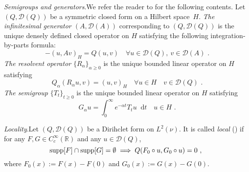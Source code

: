 \documentclass[11pt,letterpaper]{amsart}
\newcommand{\dom}[1]{\mathcal D(#1)}
\newcommand{\sem}[1]{\{#1\}_{t \ge 0}}
\newcommand{\domloc}[1]{\mathcal D_{\loc}(#1)}
\newcommand{\diff}{\mathop{}\!\mathrm{d}}
\newcommand{\R}{{\mathbb R}}
\newcommand{\comma}{\,\,\mathrm{,}\;\,}
\newcommand{\fstop}{\,\,\mathrm{.}}
\newcommand{\purple}[1]{{\color{purple}#1}}
\renewcommand{\1}{\mathbf 1}
\numberwithin{equation}{section}
\theoremstyle{plain}
\theoremstyle{definition}
\theoremstyle{remark}
\renewcommand{\paragraph}[1]{\medskip\emph{#1}.\quad}
\begin{document}
\paragraph{Semigroups and generators}We refer the reader to \cite[Chap.~I, Sec.~2]{MaRoe90} for the following contents. Let $(Q, \dom{Q})$ be a symmetric closed form on a Hilbert space~$H$.  {\it The infinitesimal generator $(A, \dom{A})$} corresponding to $(Q, \dom{Q})$ is the unique densely defined closed operator on $H$ satisfying the following integration-by-parts formula:
$$-(u, Av)_{H}=Q(u, v) \quad \forall u \in \dom{Q},\ v\in \dom{A} \fstop$$
{\it The resolvent operator} $\{R_\alpha\}_{\alpha \ge 0}$ is the unique bounded linear operator on $H$ satisfying 
$$Q_\alpha(R_\alpha u, v) = (u, v)_{H} \quad \forall u \in H \quad v \in \dom{Q} \fstop$$
{\it The semigroup} $\{T_t\}_{t \ge 0}$ is the unique bounded linear operator on $H$ satisfying 
$$G_\alpha u = \int_{0}^\infty e^{-\alpha t} T_{t}u \diff t \quad u \in H\fstop$$

\paragraph{Locality}Let $(Q, \dom{Q})$ be a Dirihclet form on $L^2(\nu)$. It is called {\it local} (\cite[Def.~5.1.2 in Chap.~I]{BouHir91}) if for any $F, G \in C_c^\infty(\R)$ and any $u \in \dom{Q}$, 
$${\rm supp}[F] \cap {\rm supp}[G] = \emptyset \implies Q(F_0\circ u, G_0\circ u)=0 \comma$$
where $F_0(x):=F(x)-F(0)$ and $G_0(x):=G(x)-G(0)$.


\end{document}
